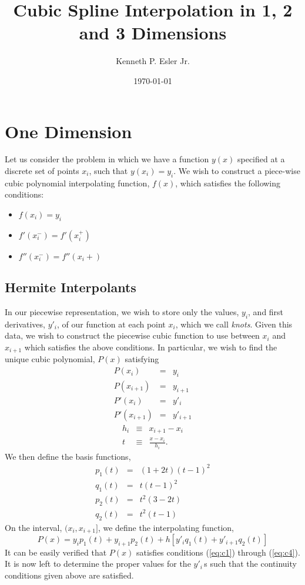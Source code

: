 \documentclass{article}
\author{Kenneth P. Esler Jr.}
\date{\today}
\title{Cubic Spline Interpolation in 1, 2 and 3 Dimensions}
\begin{document}
\maketitle
{}

\section{One Dimension}
Let us consider the problem in which we have a function $y(x)$
specified at a discrete set of points $x_i$, such that $y(x_i) = y_i$.
We wish to construct a piece-wise cubic polynomial interpolating
function, $f(x)$, which satisfies the following conditions:
\begin{itemize}
\item $f(x_i) = y_i$
\item $f'(x_i^-) = f'(x_i^+)$
\item $f''(x_i^-) = f''(x_i+)$
\end{itemize}

\subsection{Hermite Interpolants}
In our piecewise representation, we wish to store only the values,
$y_i$, and first derivatives, $y'_i$, of our function at each point
$x_i$, which we call {\em knots}.  Given this data, we wish to
construct the piecewise cubic function to use between $x_i$ and
$x_{i+1}$ which satisfies the above conditions.  In particular, we
wish to find the unique cubic polynomial, $P(x)$ satisfying
\begin{eqnarray}
P(x_i)      & = & y_i      \label{eq:c1} \\
P(x_{i+1})  & = & y_{i+1}  \label{eq:c2} \\
P'(x_i)     & = & y'_i     \label{eq:c3} \\
P'(x_{i+1}) & = & y'_{i+1} \label{eq:c4}
\end{eqnarray}
\begin{eqnarray}
h_i & \equiv & x_{i+1} - {x_i} \\
t & \equiv & \frac{x-x_i}{h_i}.
\end{eqnarray}
We then define the basis functions,
\begin{eqnarray}
p_1(t) & = & (1+2t)(t-1)^2  \label{eq:p1}\\
q_1(t) & = & t (t-1)^2      \\
p_2(t) & = & t^2(3-2t)      \\
q_2(t) & = & t^2(t-1)      \label{eq:q2}
\end{eqnarray}
On the interval, $(x_i, x_{i+1}]$, we define the interpolating
function,
\begin{equation}
P(x) = y_i p_1(t) + y_{i+1}p_2(t) + h\left[y'_i q_1(t) + y'_{i+1} q_2(t)\right]
\end{equation}
It can be easily verified that $P(x)$ satisfies conditions (\ref{eq:c1})
through (\ref{eq:c4}).  It is now left to
determine the proper values for the $y'_i\,$s such that the continuity
conditions given above are satisfied.
\end{document}
